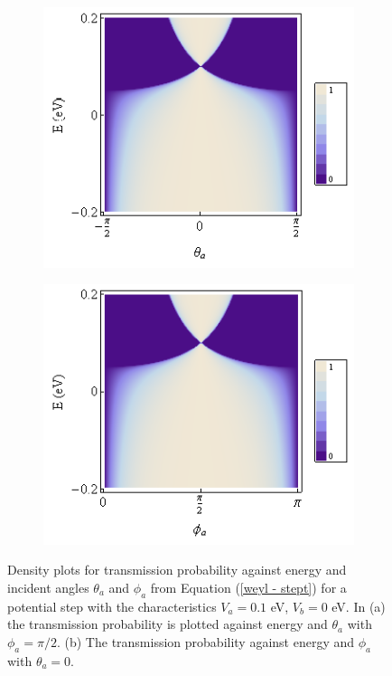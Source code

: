 		\begin{figure}[h]
			 \begin{subfigure}[h]{0.5\textwidth}
				\centerline{\includegraphics[scale=0.5]{images/weyl-step-theta}}
				\caption{}
			\end{subfigure}
			\hspace{0.5cm}
			\begin{subfigure}[h]{0.5\textwidth}
				\centerline{\includegraphics[scale=0.5]{images/weyl-step-phi}}
				\caption{}
			\end{subfigure}
			\caption{Density plots for transmission probability against energy and incident angles $\theta_{a}$ and $\phi_{a}$ from Equation (\ref{weyl - stept}) for a potential step with the characteristics $V_{a}=0.1$ eV, $V_{b}=0$ eV. In (a) the transmission probability is plotted against energy and $\theta_{a}$ with $\phi_{a}=\pi/2$. (b) The transmission probability against energy and $\phi_{a}$ with $\theta_{a}=0$. }
			\label{weyl-step-2}
		\end{figure}

